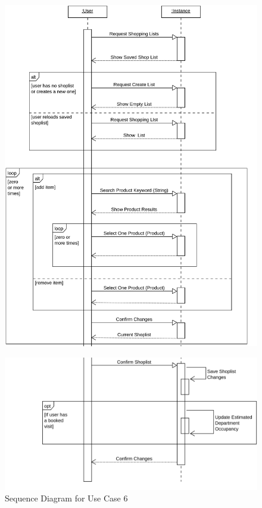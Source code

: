 \begin{figure}[H]
    \includegraphics[width=\textwidth]{Images/slice_UML_Seq_Diag_6_1.png}
\end{figure}
\begin{figure}[H]
    \includegraphics[width=\textwidth]{Images/slice_UML_Seq_Diag_6_2.png}
    \caption{\label{fig:Use_Case_Diag}Sequence Diagram for Use Case 6}
\end{figure}

